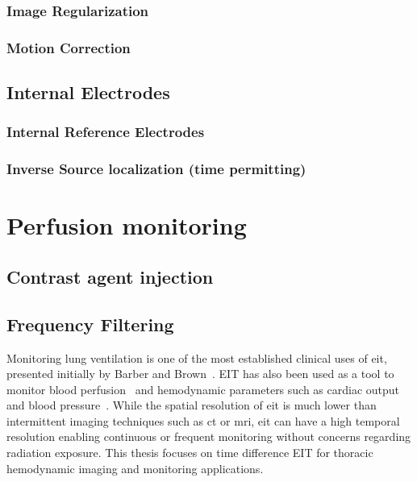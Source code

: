 \subsubsection{Image Regularization}

\subsubsection{Motion Correction}

\subsection{Internal Electrodes}
\subsubsection{Internal Reference Electrodes}
\subsubsection{Inverse Source localization (time permitting)}










\section{Perfusion monitoring}
\subsection{Contrast agent injection}
\subsection{Frequency Filtering}


Monitoring lung ventilation is one of the most
established clinical uses of 
\acrshort{eit}, presented initially by Barber and Brown~\parencite{Barber1984}.
EIT has also been used as a tool to monitor blood 
perfusion~\parencite{Brown1992} and hemodynamic parameters such as 
cardiac output~\parencite{Braun2018} and blood pressure~\parencite{Sola2011,Proenca2017}. 
While the spatial resolution of \acrshort{eit} is much lower than 
intermittent imaging techniques such as \acrfull{ct} or \acrfull{mri},
\acrshort{eit} can have a high temporal resolution enabling continuous or frequent 
monitoring without concerns regarding radiation exposure.
This thesis focuses on time difference EIT for thoracic hemodynamic imaging and monitoring applications. 

